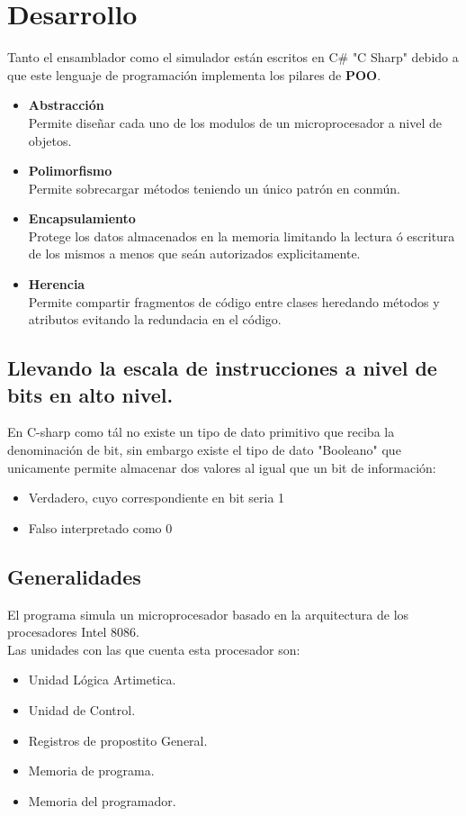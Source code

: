 \documentclass[conference]{IEEEtran}
\begin{document}
\section{Desarrollo}
Tanto el ensamblador como el simulador están escritos en C\# "C Sharp" 
debido a que este lenguaje de programación implementa los pilares de \textbf{POO}.
\begin{itemize}
    \item \textbf{Abstracción}\\ 
    Permite diseñar cada uno de los modulos de un microprocesador a nivel de objetos.
    \item \textbf{Polimorfismo}\\
    Permite sobrecargar métodos teniendo un único patrón en conmún.
    \item \textbf{Encapsulamiento}\\
     Protege los datos almacenados en la memoria limitando la lectura ó escritura de los mismos a menos que seán autorizados explicitamente.
    \item \textbf{Herencia}\\
    Permite compartir fragmentos de código entre clases heredando métodos y atributos evitando la redundacia en el código.
\end{itemize}

\subsection{\textbf{Llevando la escala de instrucciones a nivel de bits en alto nivel.}}
En C-sharp como tál no existe un tipo de dato primitivo que reciba la denominación de bit, sin embargo existe 
el tipo de dato "Booleano" que unicamente permite almacenar dos valores al igual que un bit de información:
\begin{itemize}
    \item Verdadero, cuyo correspondiente en bit seria 1
    \item Falso interpretado como 0
\end{itemize}
\subsection{Generalidades}
El programa simula un microprocesador basado en la
arquitectura de los procesadores Intel 8086.\\
Las unidades con las que cuenta esta procesador son:
\begin{itemize}
    \item Unidad Lógica Artimetica.
    \item Unidad de Control.
    \item Registros de propostito General.
    \item Memoria de programa.
    \item Memoria del programador.
\end{itemize}
\end{document}

